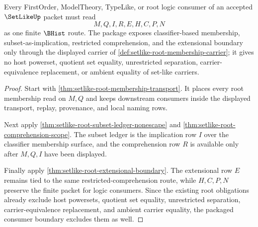 \begin{theorem}
\label{thm:setlike-root-finite-route-package}
Every FirstOrder, ModelTheory, TypeLike, or root logic consumer of an accepted $\SetLikeUp$ packet must read
$$
M,Q,I,R,E,H,C,P,N
$$
as one finite $\BHist$ route. The package exposes classifier-based membership, subset-as-implication, restricted comprehension, and the extensional boundary only through the displayed carrier of \autoref{def:setlike-root-membership-carrier}; it gives no host powerset, quotient set equality, unrestricted separation, carrier-equivalence replacement, or ambient equality of set-like carriers.
\end{theorem}
\begin{proof}
Start with \autoref{thm:setlike-root-membership-transport}. It places every root membership read on $M,Q$ and keeps downstream consumers inside the displayed transport, replay, provenance, and local naming rows.

Next apply \autoref{thm:setlike-root-subset-ledger-nonescape} and \autoref{thm:setlike-root-comprehension-scope}. The subset ledger is the implication row $I$ over the classifier membership surface, and the comprehension row $R$ is available only after $M,Q,I$ have been displayed.

Finally apply \autoref{thm:setlike-root-extensional-boundary}. The extensional row $E$ remains tied to the same restricted-comprehension route, while $H,C,P,N$ preserve the finite packet for logic consumers. Since the existing root obligations already exclude host powersets, quotient set equality, unrestricted separation, carrier-equivalence replacement, and ambient carrier equality, the packaged consumer boundary excludes them as well.
\end{proof}

